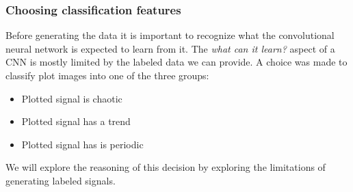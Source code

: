 \documentclass[a4paper,12pt,fleqn]{article}
\begin{document}
\subsubsection{Choosing classification features}
Before generating the data it is important to recognize what the convolutional neural network is expected to learn from it.
The \emph{what can it learn?} aspect of a CNN is mostly limited by the labeled data we can provide.
A choice was made to classify plot images into one of the three groups:
\begin{itemize}
  \item Plotted signal is chaotic
  \item Plotted signal has a trend
  \item Plotted signal has is periodic
\end{itemize}
We will explore the reasoning of this decision by exploring the limitations of generating labeled signals.


\end{document}

